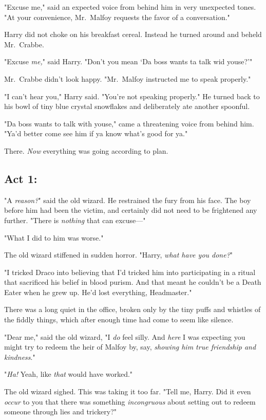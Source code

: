 "Excuse me," said an expected voice from behind him in very unexpected tones. 
"At your convenience, Mr.~Malfoy requests the favor of a conversation."

Harry did not choke on his breakfast cereal. Instead he turned around and 
beheld Mr.~Crabbe.

"Excuse \emph{me,}" said Harry. "Don't you mean `Da boss wants ta talk wid 
youse?'"

Mr.~Crabbe didn't look happy. "Mr.~Malfoy instructed me to speak properly."

"I can't hear you," Harry said. "You're not speaking properly." He turned back 
to his bowl of tiny blue crystal snowflakes and deliberately ate another 
spoonful.

"Da boss wants to talk with youse," came a threatening voice from behind him. 
"Ya'd better come see him if ya know what's good for ya."

There. \emph{Now} everything was going according to plan.
\sbreak
\subsection{Act 1:}

"A \emph{reason?}" said the old wizard. He restrained the fury from his face. 
The boy before him had been the victim, and certainly did not need to be 
frightened any further. "There is \emph{nothing} that can excuse---"

"What I did to him was worse."

The old wizard stiffened in sudden horror. "Harry, \emph{what have you done?}"

"I tricked Draco into believing that I'd tricked him into participating in a 
ritual that sacrificed his belief in blood purism. And that meant he couldn't 
be a Death Eater when he grew up. He'd lost everything, Headmaster."

There was a long quiet in the office, broken only by the tiny puffs and 
whistles of the fiddly things, which after enough time had come to seem like 
silence.

"Dear me," said the old wizard, "I \emph{do} feel silly. And \emph{here} I was 
expecting you might try to redeem the heir of Malfoy by, say, \emph{showing him 
true friendship and kindness}."

"\emph{Ha!} Yeah, like \emph{that} would have worked."

The old wizard sighed. This was taking it too far. "Tell me, Harry. Did it even 
\emph{occur} to you that there was something \emph{incongruous} about setting 
out to redeem someone through lies and trickery?"

